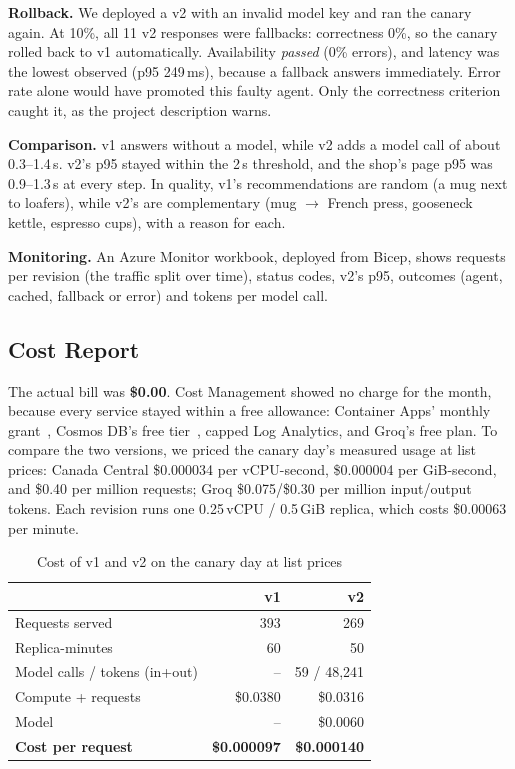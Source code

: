 \documentclass[conference]{IEEEtran}
\begin{document}
\textbf{Rollback.} We deployed a v2 with an invalid model key and ran the
canary again. At 10\%, all 11 v2 responses were fallbacks: correctness 0\%,
so the canary rolled back to v1 automatically. Availability \emph{passed}
(0\% errors), and latency was the lowest observed (p95 249\,ms), because a
fallback answers immediately. Error rate alone would have promoted this
faulty agent. Only the correctness criterion caught it, as the project
description warns.

\textbf{Comparison.} v1 answers without a model, while v2 adds a model call
of about 0.3--1.4\,s. v2's p95 stayed within the 2\,s threshold, and the
shop's page p95 was 0.9--1.3\,s at every step. In quality, v1's
recommendations are random (a mug next to loafers), while v2's are
complementary (mug $\rightarrow$ French press, gooseneck kettle, espresso
cups), with a reason for each.

\textbf{Monitoring.} An Azure Monitor workbook, deployed from Bicep, shows
requests per revision (the traffic split over time), status codes, v2's
p95, outcomes (agent, cached, fallback or error) and tokens per model call.

\subsection{Cost Report}\label{sec:cost}
The actual bill was \textbf{\$0.00}. Cost Management showed no charge for
the month, because every service stayed within a free allowance: Container
Apps' monthly grant~\cite{aca-billing}, Cosmos DB's free tier~\cite{cosmos-free},
capped Log Analytics, and Groq's free plan. To compare the two versions, we
priced the canary day's measured usage at list prices: Canada Central
\$0.000034 per vCPU-second, \$0.000004 per GiB-second, and \$0.40 per
million requests; Groq \$0.075/\$0.30 per million input/output tokens.
Each revision runs one 0.25\,vCPU / 0.5\,GiB replica, which costs
\$0.00063 per minute.

\begin{table}[t]
\caption{Cost of v1 and v2 on the canary day at list prices}
\label{tab:cost}
\centering\small
\begin{tabular}{@{}lrr@{}}
\toprule
 & v1 & v2 \\
\midrule
Requests served & 393 & 269 \\
Replica-minutes & 60 & 50 \\
Model calls / tokens (in+out) & -- & 59 / 48{,}241 \\
Compute + requests & \$0.0380 & \$0.0316 \\
Model & -- & \$0.0060 \\
\textbf{Cost per request} & \textbf{\$0.000097} & \textbf{\$0.000140} \\
\bottomrule
\end{tabular}
\end{table}
\end{document}
